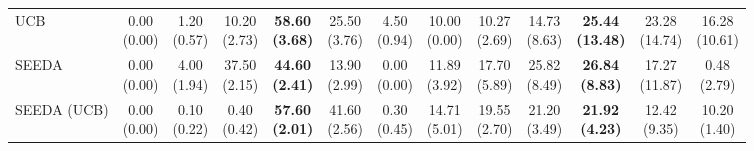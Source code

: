 \begin{table}[H]
{\begin{tabular}{l|cccccc|cccccc}
UCB & \makecell{0.00 \\ (0.00)} & \makecell{1.20 \\ (0.57)} & {\cellcolor[HTML]{C8E6C9}} \makecell{10.20 \\ (2.73)} & \bfseries \makecell{58.60 \\ (3.68)} & \makecell{25.50 \\ (3.76)} & \makecell{4.50 \\ (0.94)} & \makecell{10.00 \\ (0.00)} & \makecell{10.27 \\ (2.69)} & {\cellcolor[HTML]{C8E6C9}} \makecell{14.73 \\ (8.63)} & \bfseries \makecell{25.44 \\ (13.48)} & \makecell{23.28 \\ (14.74)} & \makecell{16.28 \\ (10.61)} \\
SEEDA & \makecell{0.00 \\ (0.00)} & \makecell{4.00 \\ (1.94)} & {\cellcolor[HTML]{C8E6C9}} \makecell{37.50 \\ (2.15)} & \bfseries \makecell{44.60 \\ (2.41)} & \makecell{13.90 \\ (2.99)} & \makecell{0.00 \\ (0.00)} & \makecell{11.89 \\ (3.92)} & \makecell{17.70 \\ (5.89)} & {\cellcolor[HTML]{C8E6C9}} \makecell{25.82 \\ (8.49)} & \bfseries \makecell{26.84 \\ (8.83)} & \makecell{17.27 \\ (11.87)} & \makecell{0.48 \\ (2.79)} \\
SEEDA (UCB) & \makecell{0.00 \\ (0.00)} & \makecell{0.10 \\ (0.22)} & {\cellcolor[HTML]{C8E6C9}} \makecell{0.40 \\ (0.42)} & \bfseries \makecell{57.60 \\ (2.01)} & \makecell{41.60 \\ (2.56)} & \makecell{0.30 \\ (0.45)} & \makecell{14.71 \\ (5.01)} & \makecell{19.55 \\ (2.70)} & {\cellcolor[HTML]{C8E6C9}} \makecell{21.20 \\ (3.49)} & \bfseries \makecell{21.92 \\ (4.23)} & \makecell{12.42 \\ (9.35)} & \makecell{10.20 \\ (1.40)} \\

\end{tabular}}
\end{table}
